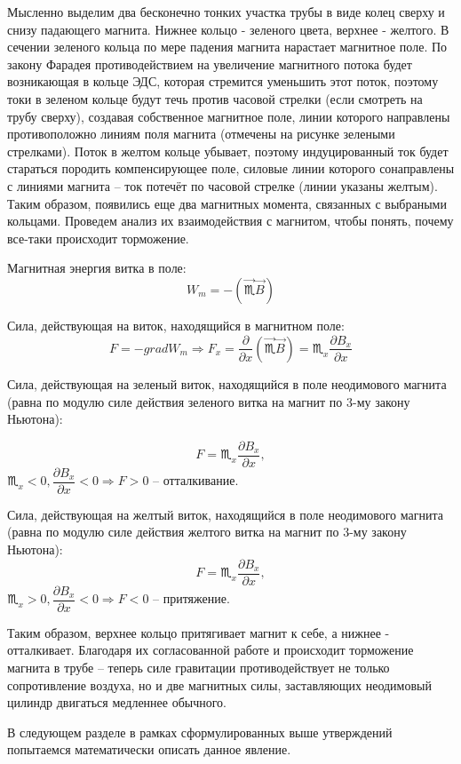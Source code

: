 \documentclass[a4paper,12pt]{article} %
\begin{document}
Мысленно выделим два бесконечно тонких участка трубы в виде колец сверху и снизу падающего магнита. Нижнее кольцо - зеленого цвета, верхнее - желтого. В сечении зеленого кольца по мере падения магнита нарастает магнитное поле. По закону Фарадея противодействием на увеличение магнитного потока будет возникающая в кольце ЭДС, которая стремится уменьшить этот поток, поэтому токи в зеленом кольце будут течь против часовой стрелки (если смотреть на трубу сверху), создавая собственное магнитное поле, линии которого направлены противоположно линиям поля магнита (отмечены на рисунке зелеными стрелками). Поток в желтом кольце убывает, поэтому индуцированный ток будет стараться породить компенсирующее поле, силовые линии которого сонаправлены с линиями магнита -- ток потечёт по часовой стрелке (линии указаны желтым). Таким образом, появились еще два магнитных момента, связанных с выбраными кольцами. Проведем анализ их взаимодействия с магнитом, чтобы понять, почему все-таки происходит торможение. 

Магнитная энергия витка в поле: $$W_m = -(\overrightarrow{\scorpio}\overrightarrow{B})$$

Сила, действующая на виток, находящийся в магнитном поле: $$F = -grad W_m \Rightarrow F_x = \dfrac{\partial}{\partial x}(\overrightarrow{\scorpio}\overrightarrow{B}) = \scorpio_x \dfrac{\partial B_x}{\partial x} $$

Сила, действующая на зеленый виток, находящийся в поле неодимового магнита (равна по модулю силе действия зеленого витка на магнит по 3-му закону Ньютона): 

$$F = \scorpio_x \dfrac{\partial B_x}{\partial x},$$
\vspace{2mm}
$\scorpio_x < 0, \dfrac{\partial B_x}{\partial x} < 0 \Rightarrow F > 0$ -- отталкивание.

Сила, действующая на желтый виток, находящийся в поле неодимового магнита (равна по модулю силе действия желтого витка на магнит по 3-му закону Ньютона): $$F = \scorpio_x \dfrac{\partial B_x}{\partial x},$$ $\scorpio_x > 0, \dfrac{\partial B_x}{\partial x} < 0 \Rightarrow F < 0$ -- притяжение.

Таким образом, верхнее кольцо притягивает магнит к себе, а нижнее - отталкивает. Благодаря их согласованной работе и происходит торможение магнита в трубе -- теперь силе гравитации противодействует не только сопротивление воздуха, но и две магнитных силы, заставляющих неодимовый цилиндр двигаться медленнее обычного.

\vspace{2mm}
В следующем разделе в рамках сформулированных выше утверждений попытаемся математически описать данное явление.
\end{document}
